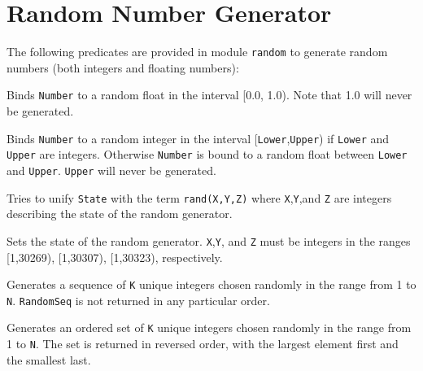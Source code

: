 \section{Random Number Generator}

The following predicates are provided in module \texttt{random} to
generate random numbers (both integers and floating numbers):

\begin{description}

 
%
Binds \texttt{Number} to a random float in the interval [0.0, 1.0).
Note that 1.0 will never be generated.

 
    Binds \texttt{Number} to a random integer in the interval
    [\texttt{Lower},\texttt{Upper}) if \texttt{Lower} and \texttt{Upper}
    are integers.  Otherwise \texttt{Number} is bound to a random float
    between \texttt{Lower} and \texttt{Upper}.  \texttt{Upper} will
    never be generated.

 
    Tries to unify \texttt{State} with the term \texttt{rand(X,Y,Z)}
    where \texttt{X},\texttt{Y},and \texttt{Z} are integers describing
    the state of the random generator.

 
    Sets the state of the random generator.  \texttt{X},\texttt{Y}, and
    \texttt{Z} must be integers in the ranges [1,30269), [1,30307),
    [1,30323), respectively.

 
    Generates a sequence of \texttt{K} unique integers chosen randomly
    in the range from 1 to \texttt{N}.  \texttt{RandomSeq} is not
    returned in any particular order.

 
    Generates an ordered set of \texttt{K} unique integers chosen
    randomly in the range from 1 to \texttt{N}.  The set is returned in
    reversed order, with the largest element first and the smallest
    last.

\end{description}



